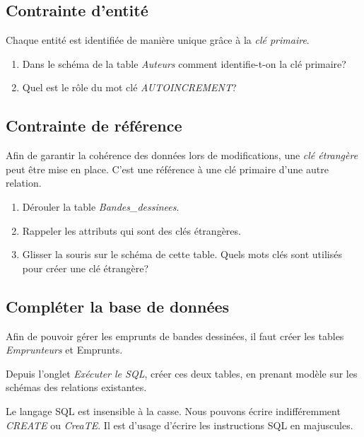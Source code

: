 \documentclass[a4paper,11pt]{article}
\begin{document}
\begin{Form}
\subsection{Contrainte d'entité}
Chaque entité est identifiée de manière unique grâce à la \emph{clé primaire}.
\begin{activite}
\begin{enumerate}
\item Dans le schéma de la table \emph{Auteurs} comment identifie-t-on la clé primaire?
\item Quel est le rôle du mot clé \emph{AUTOINCREMENT}?
\end{enumerate}
\end{activite}
\subsection{Contrainte de référence}
Afin de garantir la cohérence des données lors de modifications, une \emph{clé étrangère} peut être mise en place. C'est une référence à une clé primaire d'une autre relation.
\begin{activite}
\begin{enumerate}
\item Dérouler la table \emph{Bandes\_dessinees}.
\item Rappeler les attributs qui sont des clés étrangères.
\item Glisser la souris sur le schéma de cette table. Quels mots clés sont utilisés pour créer une clé étrangère?
\end{enumerate}
\end{activite}
\subsection{Compléter la base de données}
Afin de pouvoir gérer les emprunts de bandes dessinées, il faut créer les tables \emph{Emprunteurs} et Emprunts.
\begin{activite}
Depuis l'onglet \emph{Exécuter le SQL}, créer ces deux tables, en prenant modèle sur les schémas des relations existantes.
\end{activite}
\begin{aretenir}[Remarque]
Le langage SQL est insensible à la casse. Nous pouvons écrire indifféremment \emph{CREATE} ou \emph{CreaTE}. Il est d'usage d'écrire les instructions SQL en majuscules.
\end{aretenir}
\end{Form}
\end{document}
